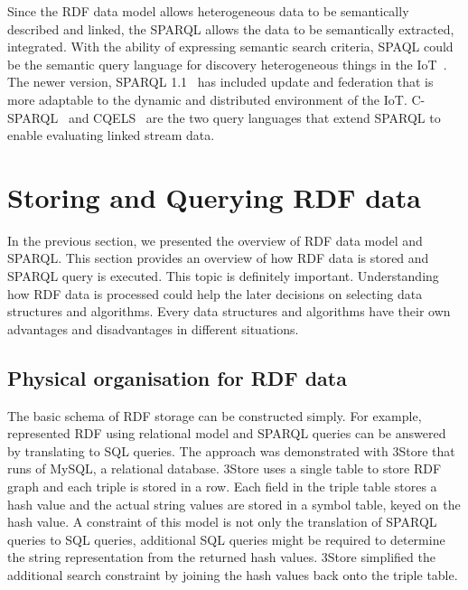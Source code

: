{Since the RDF data model allows heterogeneous data to be semantically described and linked, the SPARQL allows the data to be semantically extracted, integrated.
With the ability of expressing semantic search criteria, SPAQL could be the semantic query language for discovery heterogeneous things in the IoT~\citep{Richard:2013,Chun:2015}.
The newer version, SPARQL 1.1~\citep{Harris:2013} has included update and federation that is more adaptable to the dynamic and distributed environment of the IoT. 
C-SPARQL~\citep{Barbieri:2009} and CQELS~\citep{Le-Phuoc:2011} are the two query languages that extend SPARQL to enable evaluating linked stream data.


\section{Storing and Querying RDF data}
\label{s:sq}

In the previous section, we presented the overview of RDF data model and SPARQL.
This section provides an overview of how RDF data is stored and SPARQL query is executed. 
This topic is definitely important.
Understanding how RDF data is processed could help the later decisions on selecting data structures and algorithms.
Every data structures and algorithms have their own advantages and disadvantages in different situations.

\subsection{Physical organisation for RDF data}

The basic schema of RDF storage can be constructed simply.
For example, \cite{Harris:2005} represented RDF using relational model and SPARQL queries can be answered by translating to SQL queries.
The approach was demonstrated with 3Store that runs of MySQL, a relational database.
3Store uses a single table to store RDF graph and each triple is stored in a row. 
Each field in the triple table stores a hash value and the actual string values are stored in a symbol table, keyed on the hash value.
A constraint of this model is not only the translation of SPARQL queries to SQL queries, additional SQL queries might be required to determine the string representation from the returned hash values. 
3Store simplified the additional search constraint by joining the hash values back onto the triple table.

}
